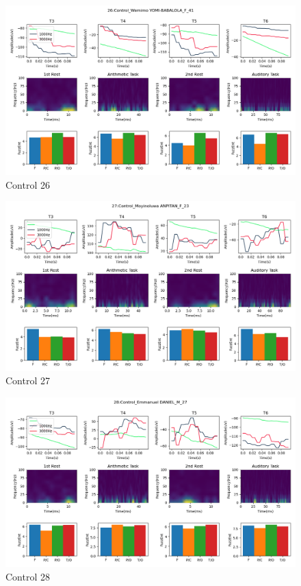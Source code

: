 \documentclass[conference]{IEEEconf}
\begin{document}
\clearpage
\begin{figure}
  \includegraphics[width=\textwidth]{../../data_analysis_results/results/Control/26.png}
  \caption{Control 26}
  \label{fig:control_26}
\end{figure}
\clearpage
\begin{figure}
  \includegraphics[width=\textwidth]{../../data_analysis_results/results/Control/27.png}
  \caption{Control 27}
  \label{fig:control_27}
\end{figure}
\clearpage
\begin{figure}
  \includegraphics[width=\textwidth]{../../data_analysis_results/results/Control/28.png}
  \caption{Control 28}
  \label{fig:control_28}
\end{figure}
\end{document}
